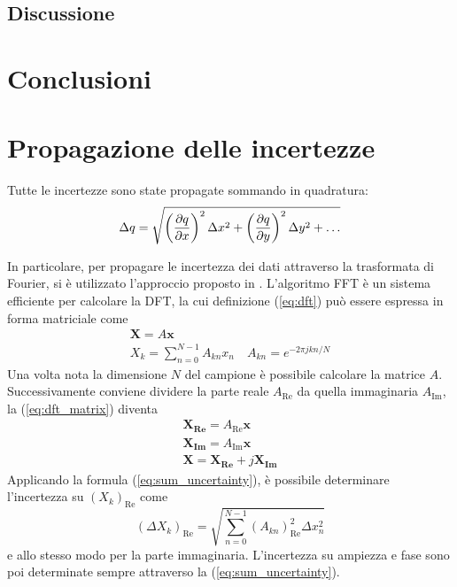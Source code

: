 \documentclass[12pt,a4paper, twocolumn]{article}
\newcommand{\bs}[1]{\boldsymbol{#1}}
\begin{document}
\subsection{Discussione}

\section{Conclusioni}

\appendixpage
\appendix
\section{Propagazione delle incertezze}
\label{app:error}
Tutte le incertezze sono state propagate sommando in quadratura:
\begin{equation}
\Delta q = \sqrt{\left(\pdv{q}{x}\right) ^2 \Delta x^2 + \left(\pdv{q}{y}\right) ^2 \Delta y^2+ \dots}
\label{eq:sum_uncertainty}
\end{equation}

In particolare, per propagare le incertezza dei dati attraverso la trasformata di Fourier, si è utilizzato l'approccio proposto in \cite{uncertainty}. L'algoritmo FFT è un sistema efficiente per calcolare la DFT, la cui definizione (\ref{eq:dft}) può essere espressa in forma matriciale come
\begin{gather}
\bs{X} = A \bs{x} \label{eq:dft_matrix} \\
X_k = \sum_{n=0}^{N-1} A_{kn} x_n \quad A_{kn} = e^{-2 \pi jkn / N}
\end{gather}
Una volta nota la dimensione $N$ del campione è possibile calcolare la matrice $A$. Successivamente conviene dividere la parte reale $A_\text{Re}$ da quella immaginaria $A_\text{Im}$, la (\ref{eq:dft_matrix}) diventa
\begin{gather*}
\bs{X_\text{Re}} = A_\text{Re} \bs{x} \\
\bs{X_\text{Im}} = A_\text{Im} \bs{x} \\
\bs{X} = \bs{X_\text{Re}} + j \bs{X_\text{Im}}
\end{gather*}
Applicando la formula (\ref{eq:sum_uncertainty}), è possibile determinare l'incertezza su $(X_k)_\text{Re}$ come
\begin{equation}
(\Delta X_k)_\text{Re} = \sqrt{\sum_{n=0}^{N-1} (A_{kn})_\text{Re}^2 \Delta x_n ^ 2}
\end{equation}
e allo stesso modo per la parte immaginaria. L'incertezza su ampiezza e fase sono poi determinate sempre attraverso la (\ref{eq:sum_uncertainty}).
\printbibliography
\end{document}

